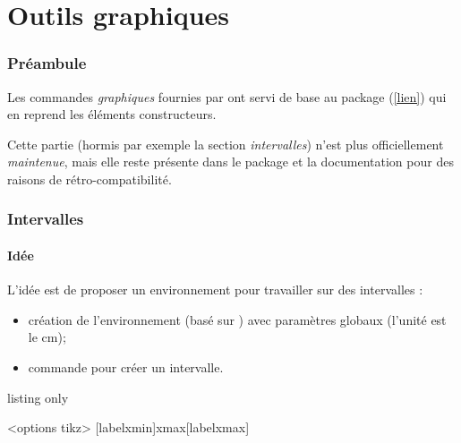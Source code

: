 \part{Outils graphiques}

\section{Préambule}

\begin{cautionblock}
Les commandes \textit{graphiques} fournies par  ont servi de base au package  (\textsf{\href{https://ctan.org/pkg/tkz-grapheur}{[lien]}}) qui en reprend les éléments constructeurs.

Cette partie (hormis par exemple la section \textit{intervalles}) n'est plus officiellement \textit{maintenue}, mais elle reste présente dans le package et la documentation pour des raisons de rétro-compatibilité.
\end{cautionblock}

\section{Intervalles}\label{intervalles}

\subsection{Idée}

\begin{tipblock}
 L'idée est de proposer un environnement pour travailler sur des intervalles :

\begin{itemize}
	\item création de l'environnement (basé sur \TikZ) avec paramètres globaux (l'unité est le cm);
	\item commande pour créer un intervalle.
\end{itemize}
\vspace*{-\baselineskip}\leavevmode
\end{tipblock}

\begin{PresCodeTexPL}{listing only}
\begin{RepIntervalles}[clés]<options tikz>
	[labelxmin]{xmax}[labelxmax]
\end{RepIntervalles}
\end{PresCodeTexPL}

